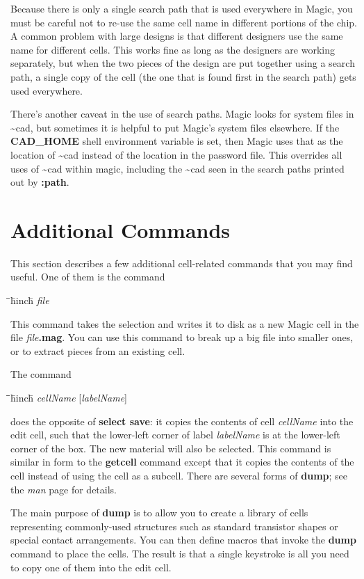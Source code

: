 \documentclass[letterpaper,twoside,12pt]{article}
\def\hinch{\hspace*{0.5in}}
\def\starti{\begin{center}\begin{tabbing}\hinch\=\hinch\=\hinch\=hinch\hinch\=\kill}
\def\endi{\end{tabbing}\end{center}}
\def\ii{\>\>\>}
\begin{document}
Because there is only a single search path that is used everywhere
in Magic, you must be careful not to re-use the same cell name in
different portions of the chip.  A common problem with large
designs is that different designers use the same name for different
cells.  This works fine as long as the designers are working separately,
but when the two pieces of the design are put together using a search
path, a single copy of the cell (the one that is found first in the search
path) gets used everywhere.

There's another caveat in the use of search paths.  Magic looks for system
files in \~{}cad, but sometimes it is helpful to put Magic's system files
elsewhere.  If the {\bfseries CAD{\_}HOME} shell environment variable is set, then
Magic uses that as the location of \~{}cad instead of the location in the
password file.  This overrides all uses of \~{}cad within magic, including 
the \~{}cad seen in the search paths printed out by {\bfseries :path}.

\section{Additional Commands}

This section describes a few additional cell-related commands that
you may find useful.  One of them is the command

\starti
   \ii {\bfseries :select save} {\itshape file}
\endi

This command takes the selection and writes it to disk as a new
Magic cell in the file {\itshape file}{\bfseries .mag}.  You can use this command
to break up a big file into smaller ones, or to extract pieces from
an existing cell.

The command

\starti
   \ii {\bfseries :dump} {\itshape cellName} [{\itshape labelName}]
\endi

does the opposite of {\bfseries select save}:  it copies the contents of
cell {\itshape cellName} into the edit cell, such that the lower-left
corner of label {\itshape labelName} is at the lower-left corner of the
box.  The new material will also be selected.  This command is similar
in form to the {\bfseries getcell} command except that it copies the contents
of the cell instead of using the cell as a subcell.  There are several
forms of {\bfseries dump};  see the {\itshape man} page for details.

The main purpose of {\bfseries dump} is to
allow you to create a library of cells representing
commonly-used  structures such as standard transistor shapes
or special contact arrangements.  You can then define macros
that invoke the {\bfseries dump} command to place the cells.  The result
is that a single keystroke is all you need to copy one of them into the
edit cell.
\end{document}
